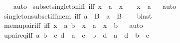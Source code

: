 \begin{isabellebody}
%
\isadelimproof
\ \ %
\endisadelimproof
%
\isatagproof
{}\isamarkupfalse%
\ auto%
\endisatagproof
{\isafoldproof}%
%
\isadelimproof
\isanewline
%
\endisadelimproof
\isanewline
{}\isamarkupfalse%
\ subset{\isacharunderscore}{\kern0pt}singleton{\isacharunderscore}{\kern0pt}iff\ {\isacharbrackleft}{\kern0pt}iff{\isacharbrackright}{\kern0pt}{\isacharcolon}{\kern0pt}\ {\isachardoublequoteopen}x\ {\isasymsubseteq}\ {\isacharbraceleft}{\kern0pt}a{\isacharbraceright}{\kern0pt}\ {\isasymlongleftrightarrow}\ x\ {\isacharequal}{\kern0pt}\ {\isacharbraceleft}{\kern0pt}{\isacharbraceright}{\kern0pt}\ {\isasymor}\ x\ {\isacharequal}{\kern0pt}\ {\isacharbraceleft}{\kern0pt}a{\isacharbraceright}{\kern0pt}{\isachardoublequoteclose}%
\isadelimproof
\ %
\endisadelimproof
%
\isatagproof
{}\isamarkupfalse%
\ auto%
\endisatagproof
{\isafoldproof}%
%
\isadelimproof
%
\endisadelimproof
\isanewline
\isanewline
{}\isamarkupfalse%
\ singleton{\isacharunderscore}{\kern0pt}subset{\isacharunderscore}{\kern0pt}iff{\isacharunderscore}{\kern0pt}mem\ {\isacharbrackleft}{\kern0pt}iff{\isacharbrackright}{\kern0pt}{\isacharcolon}{\kern0pt}\ {\isachardoublequoteopen}{\isacharbraceleft}{\kern0pt}a{\isacharbraceright}{\kern0pt}\ {\isasymsubseteq}\ B\ {\isasymlongleftrightarrow}\ a\ {\isasymin}\ B{\isachardoublequoteclose}\isanewline
%
\isadelimproof
\ \ %
\endisadelimproof
%
\isatagproof
{}\isamarkupfalse%
\ blast%
\endisatagproof
{\isafoldproof}%
%
\isadelimproof
\isanewline
%
\endisadelimproof
\isanewline
{}\isamarkupfalse%
\ mem{\isacharunderscore}{\kern0pt}upair{\isacharunderscore}{\kern0pt}iff\ {\isacharbrackleft}{\kern0pt}iff{\isacharbrackright}{\kern0pt}{\isacharcolon}{\kern0pt}\ {\isachardoublequoteopen}x\ {\isasymin}\ {\isacharbraceleft}{\kern0pt}a{\isacharcomma}{\kern0pt}\ b{\isacharbraceright}{\kern0pt}\ {\isasymlongleftrightarrow}\ x\ {\isacharequal}{\kern0pt}\ a\ {\isasymor}\ x\ {\isacharequal}{\kern0pt}\ b{\isachardoublequoteclose}%
\isadelimproof
\ %
\endisadelimproof
%
\isatagproof
{}\isamarkupfalse%
\ auto%
\endisatagproof
{\isafoldproof}%
%
\isadelimproof
%
\endisadelimproof
\isanewline
\isanewline
{}\isamarkupfalse%
\ upair{\isacharunderscore}{\kern0pt}eq{\isacharunderscore}{\kern0pt}iff{\isacharcolon}{\kern0pt}\ {\isachardoublequoteopen}{\isacharbraceleft}{\kern0pt}a{\isacharcomma}{\kern0pt}\ b{\isacharbraceright}{\kern0pt}\ {\isacharequal}{\kern0pt}\ {\isacharbraceleft}{\kern0pt}c{\isacharcomma}{\kern0pt}\ d{\isacharbraceright}{\kern0pt}\ {\isasymlongleftrightarrow}\ {\isacharparenleft}{\kern0pt}a\ {\isacharequal}{\kern0pt}\ c\ {\isasymand}\ b\ {\isacharequal}{\kern0pt}\ d{\isacharparenright}{\kern0pt}\ {\isasymor}\ {\isacharparenleft}{\kern0pt}a\ {\isacharequal}{\kern0pt}\ d\ {\isasymand}\ b\ {\isacharequal}{\kern0pt}\ c{\isacharparenright}{\kern0pt}{\isachardoublequoteclose}\isanewline

\end{isabellebody}
